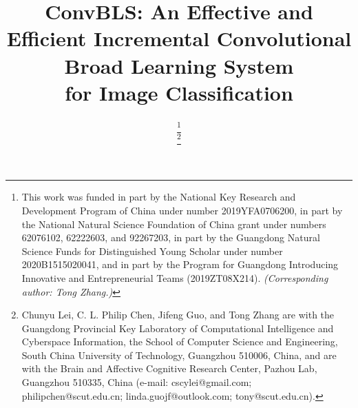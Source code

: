 \documentclass[lettersize,journal]{IEEEtran}
\begin{document}
\title{ConvBLS: An Effective and Efficient Incremental Convolutional Broad Learning System \\for Image Classification}

\author{%
    \thanks{This work was funded in part by the National Key Research and Development Program of China under number 2019YFA0706200, in part by the National Natural Science Foundation of China grant under numbers 62076102, 62222603, and 92267203, in part by the Guangdong Natural Science Funds for Distinguished Young Scholar under number 2020B1515020041, and in part by the Program for Guangdong Introducing Innovative and Entrepreneurial Teams (2019ZT08X214).
    \emph{(Corresponding author: Tong Zhang.)}}%

    \thanks{Chunyu Lei, C. L. Philip Chen, Jifeng Guo, and Tong Zhang are with the Guangdong Provincial Key Laboratory of Computational Intelligence and Cyberspace Information, the School of Computer Science and Engineering, South China University of Technology, Guangzhou 510006, China, and are with the Brain and Affective Cognitive Research Center, Pazhou Lab, Guangzhou 510335, China (e-mail: cscylei@gmail.com; philipchen@scut.edu.cn; linda.guojf@outlook.com; tony@scut.edu.cn).}
}

\maketitle
\end{document}

